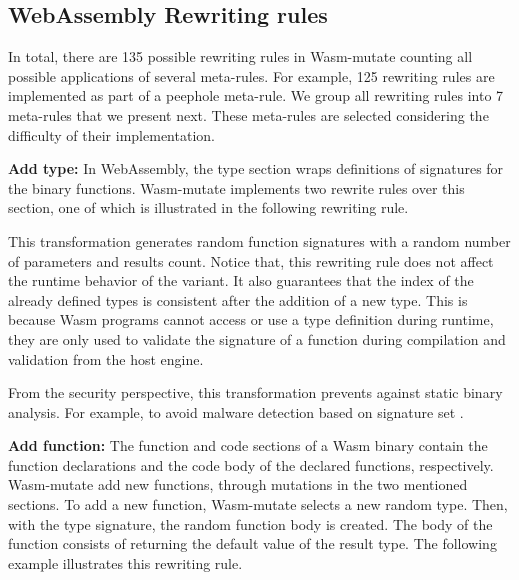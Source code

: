 \documentclass[sigplan,screen]{acmart}
\newcommand*\badge[1]{ \colorbox{red}{\color{white}#1}}
\newcommand{\tool}{Wasm-mutate\xspace}
\newcommand{\todo}[1]{%
\refstepcounter{todo}
\noindent\textbf{\badge{TODO}} {\color{red}#1}
\addcontentsline{td}{todo}
{\color{red}\thesection.\thetodo\xspace #1}}
\begin{document}
\subsection{WebAssembly Rewriting rules}

% 

In total, there are 135 possible rewriting rules in \tool counting all possible applications of several meta-rules.
For example, 125 rewriting rules are implemented as part of a peephole meta-rule.
We group all rewriting rules into 7 meta-rules that we present next.
These meta-rules are selected considering the difficulty of their implementation.

\textbf{Add type:}
In WebAssembly, the type section wraps definitions of signatures for the binary functions.
\tool implements two rewrite rules over this section, one of which is illustrated in the following rewriting rule. 



This transformation generates random function signatures with a random number of parameters and results count.
Notice that, this rewriting rule does not affect the runtime behavior of the  variant.
It also guarantees that the index of the already defined types is consistent after the addition of a new type. This is because Wasm programs cannot access or use a type definition during runtime, they are only used to validate the signature of a function during compilation and validation from the host engine.

From the security perspective, this transformation prevents against static binary analysis. 
For example, to avoid malware detection based on signature set \cite{CABRERAARTEAGA2023103296}.

\textbf{Add function:} The function and code sections of a Wasm binary contain the function  declarations and the code body of the declared functions, respectively.
\tool add new functions, through mutations in the two mentioned sections.
To add a new function, \tool selects a new random type.
Then, with the type signature, the random function body is created.
The body of the function consists of returning the default value of the result type.
The following example illustrates this rewriting rule.
\end{document}

